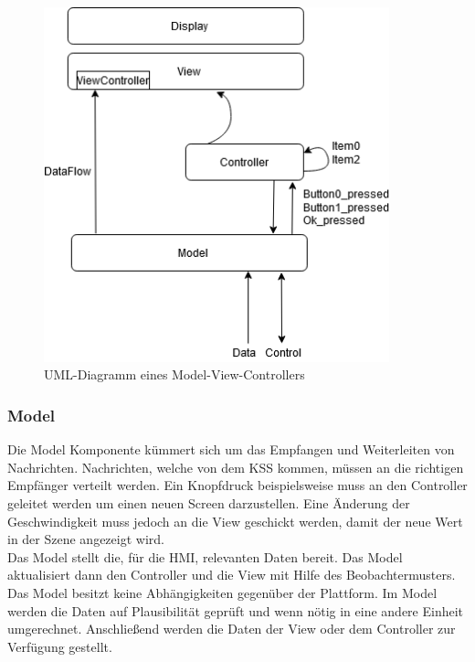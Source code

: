 \begin{figure}[htb]
	\centering
	\includegraphics[width=10cm]{img/2_stand_der_technik/ModelViewControler}
	\caption{\acs{UML}-Diagramm eines Model-View-Controllers}
	\label{fig:mvc}
\end{figure}

\newpage

\subsubsection{Model}


Die Model Komponente kümmert sich um das Empfangen und Weiterleiten von Nachrichten. Nachrichten, welche von dem \ac{KSS} kommen, müssen an die richtigen Empfänger verteilt werden. Ein Knopfdruck beispielsweise muss an den Controller geleitet werden um einen neuen Screen darzustellen. Eine Änderung der Geschwindigkeit muss jedoch an die View geschickt werden, damit der neue Wert in der Szene angezeigt wird.\\

Das Model stellt die, für die \ac{HMI}, relevanten Daten bereit. Das Model aktualisiert dann den Controller und die View mit Hilfe des Beobachtermusters. Das Model besitzt keine Abhängigkeiten gegenüber der Plattform. Im Model werden die Daten auf Plausibilität geprüft und wenn nötig in eine andere Einheit umgerechnet. Anschließend werden die Daten der View oder dem Controller zur Verfügung gestellt.\\

